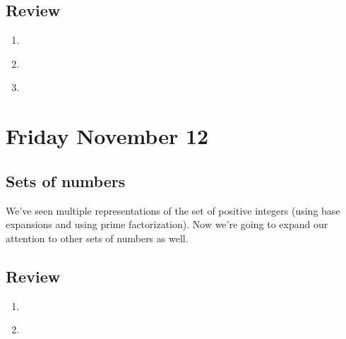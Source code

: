 \documentclass[12pt, oneside]{article}
\begin{document}
\newpage
\subsection*{Review}
\begin{enumerate}
\item \hspace{1in}\\ 
\item \hspace{1in}\\ 
\item \hspace{1in}\\ 
\end{enumerate}

\newpage
\section*{Friday November 12}






\newpage
\subsection*{Sets of numbers}

We've seen multiple representations of the set of positive integers
(using base expansions and using prime factorization). Now we're 
going to expand our attention to other sets of numbers as well.




\newpage
\subsection*{Review}
\begin{enumerate}
\item \hspace{1in}\\ 
\newpage
\item \hspace{1in}\\ 
\end{enumerate}
\end{document}
